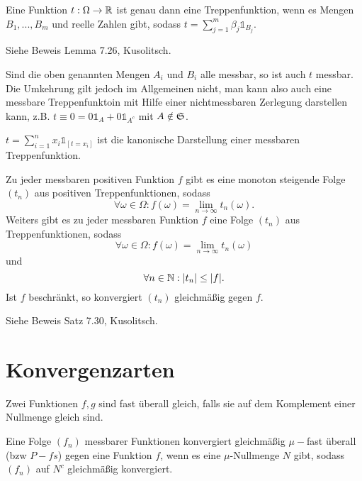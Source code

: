 			\begin{lemma}
				Eine Funktion $t:\Omega\to\mathbb{R}$ ist genau dann eine Treppenfunktion, wenn es Mengen $B_1,...,B_m$ und reelle Zahlen gibt, sodass $t=\sum_{j=1}^m\beta_j\mathds{1}_{B_j}$. 
			\end{lemma}
			
			\begin{bew}
				Siehe Beweis Lemma 7.26, Kusolitsch.
			\end{bew}
			
			\begin{bem}
				Sind die oben genannten Mengen $A_i$ und $B_i$ alle messbar, so ist auch $t$ messbar. Die Umkehrung gilt jedoch im Allgemeinen nicht, man kann also auch eine messbare Treppenfunktoin mit Hilfe einer nichtmessbaren Zerlegung darstellen kann, z.B. $t\equiv 0=0\mathds{1}_A+0\mathds{1}_{A^c}$ mit $A\notin \mathfrak{S}$. 
			\end{bem}
			
			\begin{defi}
				$t=\sum_{i=1}^{n}x_i\mathds{1}_{[t=x_i]}$ ist die kanonische Darstellung einer messbaren Treppenfunktion. 
			\end{defi}
			
			\begin{satz}
				Zu jeder messbaren positiven Funktion $f$ gibt es eine monoton steigende Folge $(t_n)$ aus positiven Treppenfunktionen, sodass 
				\[ \forall \omega\in\Omega: f(\omega)=\lim_{n\to\infty} t_n(\omega). \]
				Weiters gibt es zu jeder messbaren Funktion $f$ eine Folge $(t_n)$ aus Treppenfunktionen, sodass 
				\[ \forall \omega\in\Omega: f(\omega)=\lim_{n\to\infty} t_n(\omega) \]
				und
				\[ \forall n\in\mathbb{N}: |t_n|\le |f|. \]
				Ist $f$ beschränkt, so konvergiert $(t_n)$ gleichmäßig gegen $f$. 
			\end{satz}
			
			\begin{bew}
				Siehe Beweis Satz 7.30, Kusolitsch. 
			\end{bew}
			
		\section{Konvergenzarten}
			\begin{defi}
				Zwei Funktionen $f,g$ sind fast überall gleich, falls sie auf dem Komplement einer Nullmenge gleich sind. 
			\end{defi}
			
			\begin{defi}
				Eine Folge $(f_n)$ messbarer Funktionen konvergiert gleichmäßig $\mu-$fast überall (bzw $P-fs$) gegen eine Funktion $f$, wenn es eine $\mu$-Nullmenge $N$ gibt, sodass $(f_n)$ auf $N^c$ gleichmäßig konvergiert. 
			\end{defi}
			
